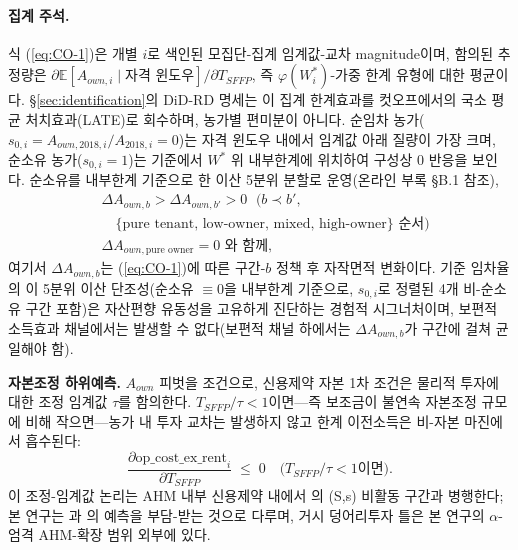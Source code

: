 \documentclass[12pt, a4paper]{article}
\begin{document}
\paragraph{집계 주석.} 식 (\ref{eq:CO-1})은 개별 $i$로 색인된 모집단-집계 임계값-교차 magnitude이며, 함의된 추정량은 $\partial \mathbb{E}[A_{own,i} \mid \text{자격 윈도우}]/\partial T_{SFFP}$, 즉 $\varphi(W_i^*)$-가중 한계 유형에 대한 평균이다. \S\ref{sec:identification}의 DiD-RD 명세는 이 집계 한계효과를 컷오프에서의 국소 평균 처치효과(LATE)로 회수하며, 농가별 편미분이 아니다. 순임차 농가($s_{0,i} = A_{own,2018,i}/A_{2018,i} = 0$)는 자격 윈도우 내에서 임계값 아래 질량이 가장 크며, 순소유 농가($s_{0,i} = 1$)는 기준에서 $W^*$ 위 내부한계에 위치하여 구성상 0 반응을 보인다. 순소유를 내부한계 기준으로 한 이산 5분위 분할로 운영(온라인 부록 \S B.1 참조),
\begin{equation}
\boxed{\begin{aligned}
&\Delta A_{own,b} > \Delta A_{own,b'} > 0
   \;\text{ ($b \prec b'$, } \\
&\quad \{\text{pure tenant},\, \text{low-owner},\, \text{mixed},\, \text{high-owner}\}\text{ 순서)} \\
&\Delta A_{own,\text{pure owner}} = 0 \text{ 와 함께,}
\end{aligned}}
\label{eq:CO-2}
\end{equation}
여기서 $\Delta A_{own,b}$는 (\ref{eq:CO-1})에 따른 구간-$b$ 정책 후 자작면적 변화이다. 기준 임차율의 이 5분위 이산 단조성(순소유 $\equiv 0$을 내부한계 기준으로, $s_{0,i}$로 정렬된 4개 비-순소유 구간 포함)은 자산편향 유동성을 고유하게 진단하는 경험적 시그너처이며, 보편적 소득효과 채널에서는 발생할 수 없다(보편적 채널 하에서는 $\Delta A_{own,b}$가 구간에 걸쳐 균일해야 함).

\textbf{자본조정 하위예측.} $A_{own}$ 피벗을 조건으로, 신용제약 자본 1차 조건은 물리적 투자에 대한 조정 임계값 $\tau$를 함의한다. $T_{SFFP}/\tau < 1$이면---즉 보조금이 불연속 자본조정 규모에 비해 작으면---농가 내 투자 교차는 발생하지 않고 한계 이전소득은 비-자본 마진에서 흡수된다:
\begin{equation}
\boxed{\frac{\partial \text{op\_cost\_ex\_rent}_i}{\partial T_{SFFP}} \;\le\; 0 \quad \text{(}T_{SFFP}/\tau < 1\text{이면)}.}
\label{eq:CO-3}
\end{equation}
이 조정-임계값 논리는 AHM 내부 신용제약 내에서 \citet{CaballeroEngel1999_lumpy}의 (S,s) 비활동 구간과 병행한다; 본 연구는 \citet{CarterOlinto2003_liquidity}과 \citet{Kazukauskas2013_disinvestment}의 예측을 부담-받는 것으로 다루며, 거시 덩어리투자 틀은 본 연구의 $\alpha$-엄격 AHM-확장 범위 외부에 있다.
\end{document}
